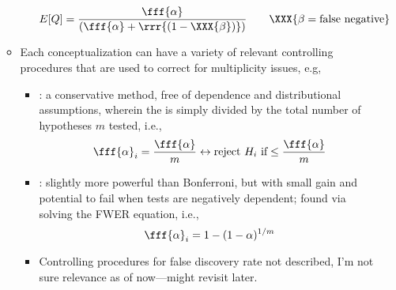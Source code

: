 \begin{itemize}
\begin{itemize}
\begin{itemize}
        \[%
        E[Q] = \frac{\fff{\alpha}}{(\fff{\alpha}+\rrr{(1-\XXX{\beta})})}\qquad \XXX{\beta=\text{false negative}}
        \]%
      \end{itemize}
    \item Each conceptualization can have a variety of relevant controlling procedures that are used to correct for multiplicity issues, e.g,
      \begin{itemize}
        \item {}: a conservative method, free of dependence and distributional assumptions, wherein the  is simply divided by the total number of hypotheses \(m\) tested, i.e.,
        \[%
        \fff{\alpha}_i = \frac{\fff{\alpha}}{m} \leftrightarrow \text{reject \(H_i\) if} \leq \frac{\fff{\alpha}}{m} 
        \]%
        \item {}: slightly more powerful than Bonferroni, but with small gain and potential to fail when tests are negatively dependent; found via solving the FWER equation, i.e.,
        \[%
        \fff{\alpha}_i = 1 - (1-\alpha)^{1/m}
        \]%
        \item Controlling procedures for false discovery rate not described, I'm not sure relevance as of now---might revisit later.
      \end{itemize}
  \end{itemize}


\end{itemize}
